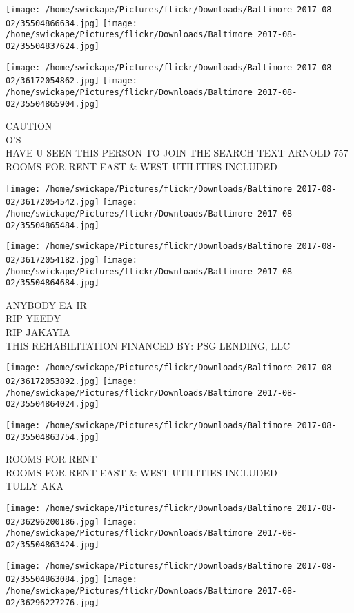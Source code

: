 \documentclass[10pt,letterpaper]{article}
\begin{document}
\texttt{[image: /home/swickape/Pictures/flickr/Downloads/Baltimore 2017-08-02/35504866634.jpg]}
\texttt{[image: /home/swickape/Pictures/flickr/Downloads/Baltimore 2017-08-02/35504837624.jpg]}

\texttt{[image: /home/swickape/Pictures/flickr/Downloads/Baltimore 2017-08-02/36172054862.jpg]}
\texttt{[image: /home/swickape/Pictures/flickr/Downloads/Baltimore 2017-08-02/35504865904.jpg]}

CAUTION\\
O'S\\
HAVE U SEEN THIS PERSON TO JOIN THE SEARCH TEXT ARNOLD 757\\
ROOMS FOR RENT EAST \& WEST UTILITIES INCLUDED
\pagebreak

\texttt{[image: /home/swickape/Pictures/flickr/Downloads/Baltimore 2017-08-02/36172054542.jpg]}
\texttt{[image: /home/swickape/Pictures/flickr/Downloads/Baltimore 2017-08-02/35504865484.jpg]}

\texttt{[image: /home/swickape/Pictures/flickr/Downloads/Baltimore 2017-08-02/36172054182.jpg]}
\texttt{[image: /home/swickape/Pictures/flickr/Downloads/Baltimore 2017-08-02/35504864684.jpg]}

ANYBODY EA IR\\
RIP YEEDY\\
RIP JAKAYIA\\
THIS REHABILITATION FINANCED BY: PSG LENDING, LLC
\pagebreak

\texttt{[image: /home/swickape/Pictures/flickr/Downloads/Baltimore 2017-08-02/36172053892.jpg]}
\texttt{[image: /home/swickape/Pictures/flickr/Downloads/Baltimore 2017-08-02/35504864024.jpg]}

\vspace{0.25in}
\texttt{[image: /home/swickape/Pictures/flickr/Downloads/Baltimore 2017-08-02/35504863754.jpg]}

ROOMS FOR RENT\\
ROOMS FOR RENT EAST \& WEST UTILITIES INCLUDED\\
TULLY AKA
\pagebreak

\texttt{[image: /home/swickape/Pictures/flickr/Downloads/Baltimore 2017-08-02/36296200186.jpg]}
\texttt{[image: /home/swickape/Pictures/flickr/Downloads/Baltimore 2017-08-02/35504863424.jpg]}

\texttt{[image: /home/swickape/Pictures/flickr/Downloads/Baltimore 2017-08-02/35504863084.jpg]}
\texttt{[image: /home/swickape/Pictures/flickr/Downloads/Baltimore 2017-08-02/36296227276.jpg]}
\end{document}
